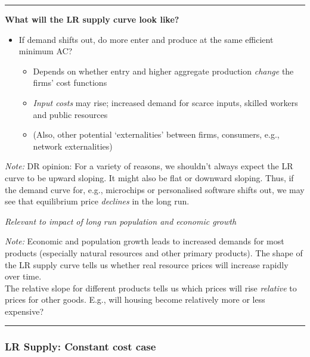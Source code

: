 \documentclass[]{article}
\providecommand{\tightlist}{%
  \setlength{\itemsep}{0pt}\setlength{\parskip}{0pt}}
\begin{document}
\begin{center}\rule{0.5\linewidth}{\linethickness}\end{center}

\textbf{What will the LR supply curve look like?}

\begin{itemize}
\tightlist
\item
  If demand shifts out, do more enter and produce at the same efficient minimum AC?

  \begin{itemize}
  \tightlist
  \item
    Depends on whether entry and higher aggregate production \emph{change} the firms' cost functions
  \item
    \emph{Input costs} may rise; increased demand for scarce inputs, skilled workers and public resources
  \item
    (Also, other potential `externalities' between firms, consumers, e.g., network externalities)
  \end{itemize}
\end{itemize}

\emph{Note:}
DR opinion: For a variety of reasons, we shouldn't always expect the LR curve to be upward sloping. It might also be flat or downward sloping. Thus, if the demand curve for, e.g., microchips or personalised software shifts out, we may see that equilibrium price \emph{declines} in the long run.

\bigskip

\emph{Relevant to impact of long run population and economic growth}

\emph{Note:}
Economic and population growth leads to increased demands for most products (especially natural resources and other primary products). The shape of the LR supply curve tells us whether real resource prices will increase rapidly over time.\\
The relative slope for different products tells us which prices will rise \emph{relative} to prices for other goods. E.g., will housing become relatively more or less expensive?

\begin{center}\rule{0.5\linewidth}{\linethickness}\end{center}

\hypertarget{lr-supply-constant-cost-case}{%
\subsubsection{LR Supply: Constant cost case}\label{lr-supply-constant-cost-case}}
\end{document}
